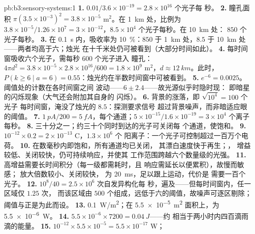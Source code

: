 \begin{solution}{pb:b3:sensory-systems:1}
\textbf{1.} $0.01/3.6\times 10^{-19} = 2.8\times 10^{16}$ 个光子每
秒。
\textbf{2.} 瞳孔面积 $\pi(3.5\times 10^{-3})^{2} = 3.8\times 10^{-5}$
m$^{2}$。在 \qty{1}{km} 处，比例为 $3.8\times 10^{-5}/1.26\times 10^{7} =
3\times 10^{-12}$，$8.5\times 10^{4}$ 个光子每秒。在 \qty{10}{km} 处：
$850$ 个光子每秒。
\textbf{3.} 在 \qty{0.1}{s} 内，吸收率为 \qty{10}{\%}：$850$ 于
\qty{1}{km} 处，$8.5$ 于 \qty{10}{km} 处——两者均高于六；烛光
在十千米处仍可被看到（大部分时间如此）。
\textbf{4.} 每时间窗吸收六个光子，需每秒 $600$ 个光子进入
瞳孔：$4\pi d^{2} = 3.8\times 10^{-5}\times 2.8\times 10^{16}/600
= 1.8\times 10^{9}$ m$^{2}$，$d \approx \qty{12}{km}$。此时，$P(k \ge
6 \mid a = 6) = 0.55$：烛光约在半数时间窗中可被看到。
\textbf{5.} $e^{-6} = 0.0025$。阈值处的计数在各时间窗之间
波动——$6 \pm 2.4$——故光源似乎时隐时现：
即暗星的闪烁现象（大气还会附加其自身的
闪烁）。
\textbf{6.} 背景的涨落，即 $\sqrt{10^{4}} = 100$ 个光子
每时间窗，淹没了烛光的 $8.5$：探测要求信号
超过背景噪声，而非暗适应眼的阈值。
\textbf{7.} $\qty{1}{pA}/200 = \qty{5}{fA}$，每个通道；$5\times
10^{-15}/1.6\times 10^{-19} = 3\times 10^{4}$ 个离子每秒。
\textbf{8.} 三十分之一；约三十个同时到达的光子可关闭每
个通道，使饱和。
\textbf{9.} $10^{-12}\times 0.2 = 2\times 10^{-13}$ C，$1.3\times 10^{6}$ 个
阳离子：一个光子可控制超过一百万个电荷。
\textbf{10.} 在数毫秒内即饱和，所有通道均已关闭，
其漂白速度快于再生；，
增益较低、关闭较快，仍可持续响应，并使其
工作范围跨越六个数量级的光强。
\textbf{11.} 高增益需要长时间积分（每一级都需耗时，且
响应需延长以便累积），故慢而敏感；
放大倍数较小、关闭较快，
为 \qty{20}{ms}，足以跟上运动，代价是
需要一百个光子。
\textbf{12.} $10^{8}/40 = 2.5\times 10^{6}$ 次自发异构化每
秒，遍及——但每时间窗内，任一区域仅 $1.25$ 次，
而该区域由 $500$ 个组成，远低于六的阈值，故噪声可逐区剔除；
阈值与正是为此而设。
\textbf{13.} \qty{0.1}{W/m^2}；在 \qty{5.5e-5}{m^2} 面积上，为 \qty{5.5e-6}{W}。
\textbf{14.} $5.5\times 10^{-6}\times 7200 = \qty{0.04}{J}$——约
相当于两小时内四百滴雨滴的能量。
\textbf{15.} $10^{-12}\times 5.5\times 10^{-5} = 5.5\times 10^{-17}$ W；

\end{solution}
